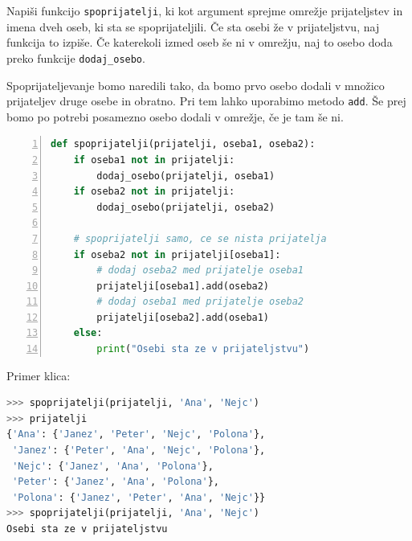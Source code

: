 \begin{zgled}
Napiši funkcijo \texttt{spoprijatelji}, ki kot argument sprejme omrežje prijateljstev in imena dveh oseb, ki sta se spoprijateljili. Če sta osebi že v prijateljstvu, naj funkcija to izpiše. Če katerekoli izmed oseb še ni v omrežju, naj to osebo doda preko funkcije \texttt{dodaj\_osebo}.
\end{zgled}
\begin{resitev}
Spoprijateljevanje bomo naredili tako, da bomo prvo osebo dodali v množico prijateljev druge osebe in obratno. Pri tem lahko uporabimo metodo \texttt{add}. Še prej bomo po potrebi posamezno osebo dodali v omrežje, če je tam še ni.
\begin{lstlisting}[language=Python,numbers=left]
def spoprijatelji(prijatelji, oseba1, oseba2):
    if oseba1 not in prijatelji:
        dodaj_osebo(prijatelji, oseba1) 
    if oseba2 not in prijatelji:
        dodaj_osebo(prijatelji, oseba2) 
    
    # spoprijatelji samo, ce se nista prijatelja
    if oseba2 not in prijatelji[oseba1]:
        # dodaj oseba2 med prijatelje oseba1
        prijatelji[oseba1].add(oseba2)
        # dodaj oseba1 med prijatelje oseba2
        prijatelji[oseba2].add(oseba1)
    else:
        print("Osebi sta ze v prijateljstvu")
\end{lstlisting}
Primer klica:
\begin{lstlisting}[language=Python]
>>> spoprijatelji(prijatelji, 'Ana', 'Nejc')
>>> prijatelji
{'Ana': {'Janez', 'Peter', 'Nejc', 'Polona'}, 
 'Janez': {'Peter', 'Ana', 'Nejc', 'Polona'}, 
 'Nejc': {'Janez', 'Ana', 'Polona'}, 
 'Peter': {'Janez', 'Ana', 'Polona'}, 
 'Polona': {'Janez', 'Peter', 'Ana', 'Nejc'}}
>>> spoprijatelji(prijatelji, 'Ana', 'Nejc')
Osebi sta ze v prijateljstvu
\end{lstlisting}

\end{resitev}

